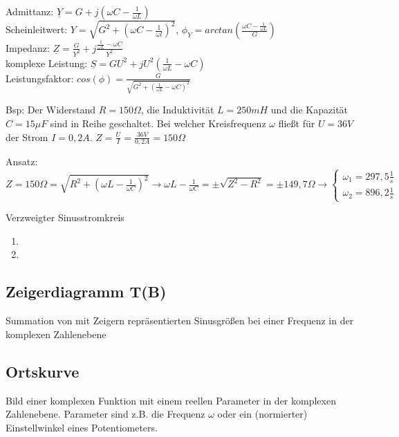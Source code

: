 \documentclass[german]{article}
\newcommand{\ohm}{\Omega}
\begin{document}
\begin{enumerate}
		Admittanz: $\underline{Y} = G + j\left( \omega C - \frac1{\omega L} \right)$ \\
		Scheinleitwert: $Y = \sqrt{G^2 + \left( \omega C - \frac1{\omega l} \right)^2}$, $\phi_Y = arctan\left( \frac{\omega C - \frac1{\omega L}}{G} \right)$ \\
		Impedanz: $\underline{Z} = \frac{G}{Y^2} + j \frac{\frac1{\omega L} - \omega C}{Y^2}$ \\
		komplexe Leistung: $\underline{S} = GU^2 + j U^2 \left( \frac1{\omega L} - \omega C \right)$ \\
		Leistungsfaktor: $cos(\phi) = \frac{G}{\sqrt{G^2 + \left( \frac1{\omega L} - \omega C \right)^2}}$
\end{enumerate}

Bsp: Der Widerstand $R = 150\ohm$, die Induktivität $L = 250mH$ und die Kapazität $C = 15\mu F$ sind in Reihe geschaltet. Bei welcher Kreisfrequenz $\omega$ fließt für $U = 36V$ der Strom $I = 0,2A$. $Z = \frac{U}{I} = \frac{36V}{0,2A} = 150\ohm$

Ansatz: $Z = 150\ohm = \sqrt{R^2 + \left(\omega L - \frac1{\omega C} \right)^2} \rightarrow \omega L - \frac1{\omega C} = \pm \sqrt{Z^2 - R^2} = \pm 149,7 \ohm \rightarrow \left\{ \begin{array}{l}\omega_1 = 297,5 \frac1s \\ \omega_2 = 896,2 \frac1s \end{array} \right.$

Verzweigter Sinusstromkreis
\begin{enumerate}
	\item %
	\item %
\end{enumerate}

\subsection{Zeigerdiagramm T(B)}
Summation von mit Zeigern repräsentierten Sinusgrößen bei einer Frequenz in der komplexen Zahlenebene

\subsection{Ortskurve}
Bild einer komplexen Funktion mit einem reellen Parameter in der komplexen Zahlenebene. Parameter sind z.B. die Frequenz $\omega$ oder ein (normierter) Einstellwinkel eines Potentiometers.
\end{document}
